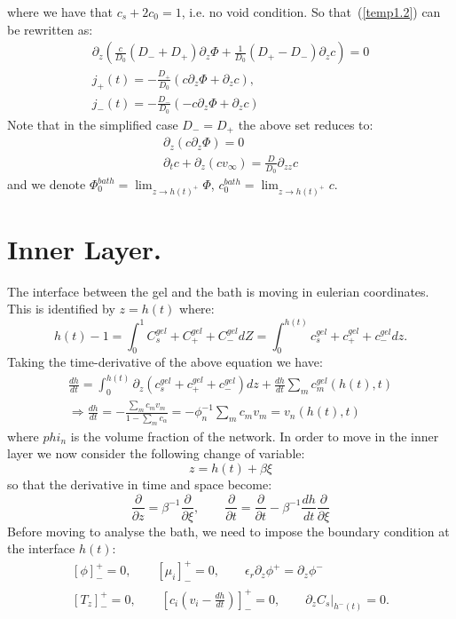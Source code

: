 \documentclass[12pt]{extarticle}
\begin{document}
where we have that $c_s+2c_0=1$, i.e. no void condition.
So that~(\ref{temp1.2}) can be rewritten as:
\begin{gather}
\partial_z\left(\frac{c}{D_0}(D_-+D_+)\partial_z\Phi+\frac{1}{D_0}(D_+-D_-)\partial_zc\right)=0\\
j_+(t)= - \frac{D_+}{D_0}\left(c\partial_z\Phi + \partial_z c\right),\\
j_-(t)= - \frac{D_-}{D_0}\left(-c\partial_z\Phi + \partial_z c\right)
\end{gather}
Note that in the simplified case $D_-=D_+$ the above set reduces to:
\begin{gather}
\partial_z\left(c\partial_z\Phi\right)=0\\
\partial_t c +\partial_z(cv_\infty)= \frac{D}{D_0} \partial_{zz} c
\end{gather}
and we denote $\Phi^{bath}_0=\lim_{z\rightarrow h(t)^+} \Phi$, $c^{bath}_0=\lim_{z\rightarrow h(t)^+} c$.
\section{Inner Layer.}
The interface between the gel and the bath is moving in eulerian coordinates. This is identified by $z=h(t)$ where:
\begin{equation}
h(t)-1=\int_0^1{C^{gel}_s+C^{gel}_++C^{gel}_-}dZ = \int_0^{h(t)} c^{gel}_s+c^{gel}_++c^{gel}_- dz.
\end{equation}
Taking the time-derivative of the above equation we have:
\begin{equation}
\begin{aligned}
\frac{d h}{dt}=\int_0^{h(t)}\partial_z\left(c^{gel}_s+c^{gel}_++c^{gel}_-\right)dz + \frac{d h}{dt}\sum_m c^{gel}_m(h(t),t)\\
\Rightarrow \frac{d h}{dt}=-\frac{\sum_m c_m v_m}{1-\sum_m c_\alpha}=-\phi_n^{-1}\sum_m c_m v_m=v_n(h(t),t)
\end{aligned}
\end{equation}
where $phi_n$ is the volume fraction of the network. In order to move in the inner layer we now consider the following change of variable:
\begin{equation}
z= h(t)+ \beta \xi
\end{equation}
so that the derivative in time and space become:
\begin{equation}
\frac{\partial}{\partial z} = \beta^{-1}\frac{\partial}{\partial \xi}, \qquad \frac{\partial}{\partial t}= \frac{\partial}{\partial t} - \beta^{-1} \frac{d h}{dt} \frac{\partial}{\partial \xi}
\end{equation}
Before moving to analyse the bath, we need to impose the boundary condition at the interface $h(t)$:
\begin{equation}
\begin{aligned}
\left[\phi\right]^+_-=0, \qquad \left[\mu_i\right]^+_-=0, \qquad \epsilon_r \partial_z \phi^+=\partial_z \phi^-\\
\left[T_z\right]^+_-=0, \qquad \left[c_i\left(v_i-\frac{dh}{dt}\right)\right]^+_-=0, \qquad\left.\partial_z C_s \right|_{h^-(t)}=0.
\end{aligned}
\end{equation}
\end{document}
